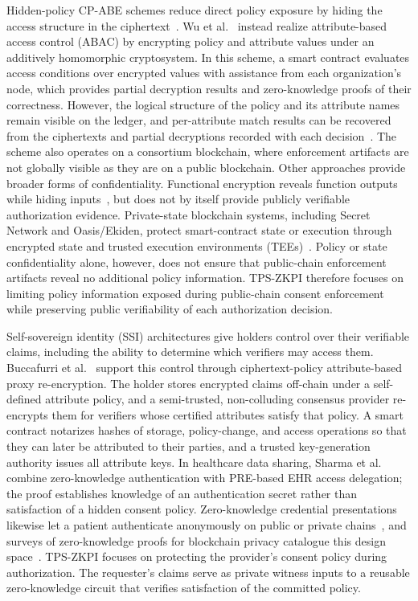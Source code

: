 Hidden-policy CP-ABE schemes reduce direct policy exposure by hiding the access structure in the ciphertext~\cite{yang2024hamed,ding2026badsabe}.
Wu et al.~\cite{wu2023blockchain} instead realize attribute-based access control (ABAC) by encrypting policy and attribute values under an additively homomorphic cryptosystem.
In this scheme, a smart contract evaluates access conditions over encrypted values with assistance from each organization's node, which provides partial decryption results and zero-knowledge proofs of their correctness.
However, the logical structure of the policy and its attribute names remain visible on the ledger, and per-attribute match results can be recovered from the ciphertexts and partial decryptions recorded with each decision~\cite{wu2023blockchain}.
The scheme also operates on a consortium blockchain, where enforcement artifacts are not globally visible as they are on a public blockchain.
Other approaches provide broader forms of confidentiality.
Functional encryption reveals function outputs while hiding inputs~\cite{boneh2011functional}, but does not by itself provide publicly verifiable authorization evidence.
Private-state blockchain systems, including Secret Network and Oasis/Ekiden, protect smart-contract state or execution through encrypted state and trusted execution environments (TEEs)~\cite{secretnetwork_docs,cheng2019ekiden}.
Policy or state confidentiality alone, however, does not ensure that public-chain enforcement artifacts reveal no additional policy information.
TPS-ZKPI therefore focuses on limiting policy information exposed during public-chain consent enforcement while preserving public verifiability of each authorization decision.

Self-sovereign identity (SSI) architectures give holders control over their verifiable claims, including the ability to determine which verifiers may access them.
Buccafurri et al.~\cite{buccafurri2024holder} support this control through ciphertext-policy attribute-based proxy re-encryption. The holder stores encrypted claims off-chain under a self-defined attribute policy, and a semi-trusted, non-colluding consensus provider re-encrypts them for verifiers whose certified attributes satisfy that policy. A smart contract notarizes hashes of storage, policy-change, and access operations so that they can later be attributed to their parties, and a trusted key-generation authority issues all attribute keys.
In healthcare data sharing, Sharma et al.~\cite{sharma2020blockchain} combine zero-knowledge authentication with PRE-based EHR access delegation; the proof establishes knowledge of an authentication secret rather than satisfaction of a hidden consent policy.
Zero-knowledge credential presentations likewise let a patient authenticate anonymously on public or private chains~\cite{madine2025zero}, and surveys of zero-knowledge proofs for blockchain privacy catalogue this design space~\cite{shashidhara2024promise,zhou2024leveraging}.
TPS-ZKPI focuses on protecting the provider's consent policy during authorization.
The requester's claims serve as private witness inputs to a reusable zero-knowledge circuit that verifies satisfaction of the committed policy.

